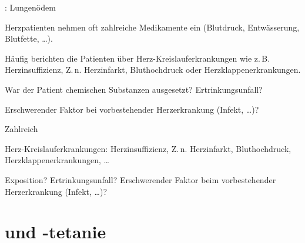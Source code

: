 \TextSlide
{{\TxSAMPLER}: Lungenödem}
{
\begin{SAMPLERText}
  \item[\SAMPLER{M}] Herzpatienten nehmen oft zahlreiche
  Medikamente ein (Blutdruck, Entwässerung, Blutfette,
  \ldots).
  \item[\SAMPLER{P}] Häufig berichten die Patienten über
  Herz-Kreislauferkrankungen wie z.\,B. Herzinsuffizienz,
  Z.\,n. Herzinfarkt, Bluthochdruck oder
  Herzklappenerkrankungen.
  \item[\SAMPLER{E}] War der Patient chemischen Substanzen ausgesetzt?
  Ertrinkungsunfall?
  
  Erschwerender Faktor bei vorbestehender Herzerkrankung
  (Infekt, \ldots)?
\end{SAMPLERText}
}
{
\begin{SAMPLERSlide}
  \item[\SAMPLER{M}] Zahlreich
  \item[\SAMPLER{P}] Herz-Kreislauferkrankungen: Herzinsuffizienz,
  Z.\,n. Herzinfarkt, Bluthochdruck,
  Herzklappenerkrankungen, \ldots
  \item[\SAMPLER{E}] Exposition? Ertrinkungsunfall?
  Erschwerender Faktor beim vorbestehender Herzerkrankung
  (Infekt, \ldots)?
\end{SAMPLERSlide}
}
{}
{}
{}








\section{ und -tetanie}
\label{topic:hyperventilationstetanie}
\label{topic:hyperventilationssyndrom}



